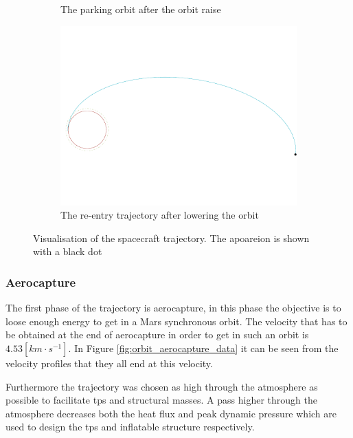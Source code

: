 \begin{figure}
\begin{subfigure}[b]{0.7\textwidth}
		\vspace{-15mm}
		\caption{The parking orbit after the orbit raise}
		\label{fig:parking_trajectory}
	\end{subfigure}
	\begin{subfigure}[b]{0.7\textwidth}
		\vspace{-22mm}
		\includegraphics[width=\textwidth]{./Figure/Orbit/re-entry_trajectory.pdf}
		\vspace{-25mm}
		\caption{The re-entry trajectory after lowering the orbit}
		\label{fig:re_entry_trajectory}
	\end{subfigure}
	\caption[Visualisation of the spacecraft trajectory]{Visualisation of the spacecraft trajectory. The apoareion is shown with a black dot}
	\label{fig:trajectory}
\end{figure}

\subsubsection{Aerocapture} \label{sec:aerocapture}
The first phase of the trajectory is aerocapture, in this phase the objective is to loose enough energy to get in a Mars synchronous orbit. The velocity that has to be obtained at the end of aerocapture in order to get in such an orbit is $4.53 \left[km \cdot s^{-1}\right]$. In Figure \ref{fig:orbit_aerocapture_data} it can be seen from the velocity profiles that they all end at this velocity.

Furthermore the trajectory was chosen as high through the atmosphere as possible to facilitate \gls{tps} and structural masses. A pass higher through the atmosphere decreases both the heat flux and peak dynamic pressure which are used to design the \gls{tps} and inflatable structure respectively.

